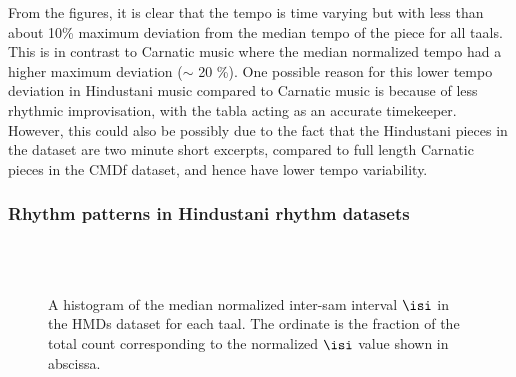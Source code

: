 From the figures, it is clear that the tempo is time varying but with less than about 10\% maximum deviation from the median tempo of the piece for all \glspl{taal}. This is in contrast to Carnatic music where the median normalized tempo had a higher maximum deviation ($\sim$ 20 \%). One possible reason for this lower tempo deviation in Hindustani music compared to Carnatic music is because of less rhythmic improvisation, with the tabla acting as an accurate timekeeper. However, this could also be possibly due to the fact that the Hindustani pieces in the dataset are two minute short excerpts, compared to full length Carnatic pieces in the \acrshort{CMDf} dataset, and hence have lower tempo variability. 
%
%
\subsubsection{Rhythm patterns in Hindustani rhythm datasets}
\begin{figure}[t]
\centering
{} \hspace{0.5cm} 
 \\ 
 \hspace{0.5cm} 
 \\ 
\caption[Histogram of median normalized $\protect\isi$ in the \acrshort{HMDs} dataset]{A histogram of the median normalized inter-\gls{sam} interval $\protect\isi$ in the \acrshort{HMDs} dataset for each \gls{taal}. The ordinate is the fraction of the total count corresponding to the normalized $\isi$ value shown in abscissa.}\label{fig:dstats:HMDs:ISInorm}
\end{figure}
%
